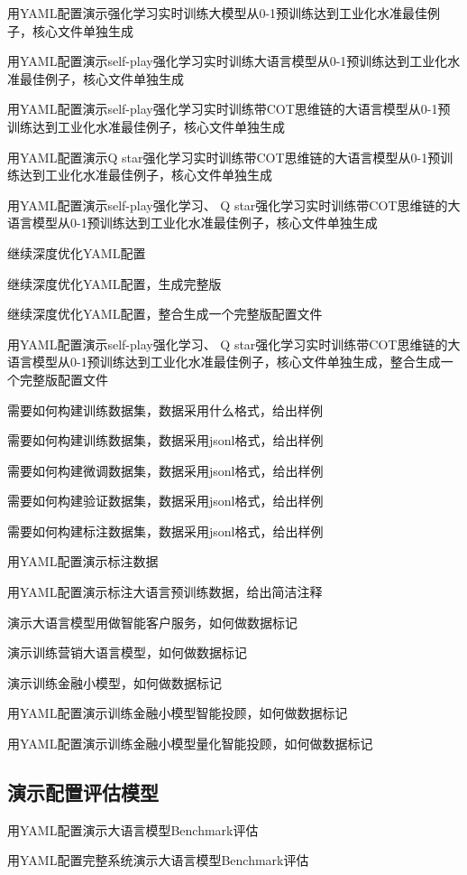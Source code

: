 \documentclass[12pt]{book}
\begin{document}
用YAML配置演示强化学习实时训练大模型从0-1预训练达到工业化水准最佳例子，核心文件单独生成

用YAML配置演示self-play强化学习实时训练大语言模型从0-1预训练达到工业化水准最佳例子，核心文件单独生成

用YAML配置演示self-play强化学习实时训练带COT思维链的大语言模型从0-1预训练达到工业化水准最佳例子，核心文件单独生成


用YAML配置演示Q star强化学习实时训练带COT思维链的大语言模型从0-1预训练达到工业化水准最佳例子，核心文件单独生成


用YAML配置演示self-play强化学习、 Q star强化学习实时训练带COT思维链的大语言模型从0-1预训练达到工业化水准最佳例子，核心文件单独生成


继续深度优化YAML配置

继续深度优化YAML配置，生成完整版

继续深度优化YAML配置，整合生成一个完整版配置文件

用YAML配置演示self-play强化学习、 Q star强化学习实时训练带COT思维链的大语言模型从0-1预训练达到工业化水准最佳例子，核心文件单独生成，整合生成一个完整版配置文件


需要如何构建训练数据集，数据采用什么格式，给出样例

需要如何构建训练数据集，数据采用jsonl格式，给出样例

需要如何构建微调数据集，数据采用jsonl格式，给出样例

需要如何构建验证数据集，数据采用jsonl格式，给出样例

需要如何构建标注数据集，数据采用jsonl格式，给出样例


用YAML配置演示标注数据


用YAML配置演示标注大语言预训练数据，给出简洁注释

演示大语言模型用做智能客户服务，如何做数据标记

演示训练营销大语言模型，如何做数据标记

演示训练金融小模型，如何做数据标记

用YAML配置演示训练金融小模型智能投顾，如何做数据标记

用YAML配置演示训练金融小模型量化智能投顾，如何做数据标记




\subsection{演示配置评估模型}
用YAML配置演示大语言模型Benchmark评估

用YAML配置完整系统演示大语言模型Benchmark评估
\end{document}
